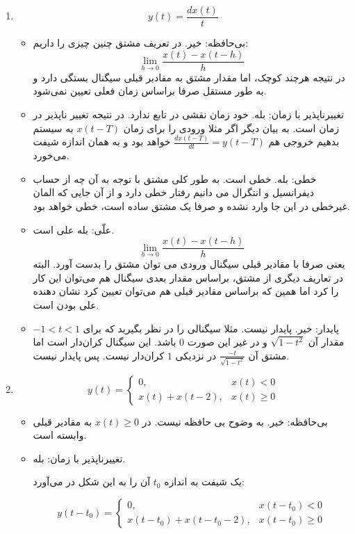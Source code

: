 \documentclass[12pt]{article}
\begin{document}
\begin{enumerate}[label = \harfi*)]
\item

$$
y(t) = \frac{d x(t)}{t}
$$

\begin{itemize}
	\item
	بی‌حافظه: خیر. در تعریف مشتق چنین چیزی را داریم:
	$$\lim_{h \to 0} \frac{x(t) - x(t-h)}{h}$$
	در نتیجه هر‌چند کوچک، اما مقدار مشتق به مقادیر قبلی سیگنال بستگی دارد و به طور مستقل صرفا براساس زمان فعلی تعیین نمی‌شود.
	\item
	تغییرناپذیر با زمان: بله. خود زمان نقشی در تابع ندارد. در نتیجه تغییر ناپذیر در زمان است. به بیان دیگر اگر مثلا ورودی را برای زمان $x(t-T)$ به سیستم بدهیم خروجی هم
	$\frac{d x(t-T)}{dt} = y(t-T)$
	خواهد بود و به همان اندازه شیفت می‌خورد.
	
	\item
	خطی: بله. خطی است. به طور کلی مشتق با توجه به آن چه از حساب دیفرانسیل و انتگرال می دانیم رفتار خطی دارد و از آن جایی که المان غیرخطی در این جا وارد نشده و صرفا یک مشتق ساده است، خطی خواهد بود.
	\item
	علّی: 
	بله علی است. 
		$$\lim_{h \to 0} \frac{x(t) - x(t-h)}{h}$$
		یعنی صرفا با مقادیر قبلی سیگنال ورودی می توان مشتق را بدست آورد. البته در تعاریف دیگری از مشتق، براساس مقدار بعدی سیگنال هم می‌توان این کار را کرد اما همین که براساس مقادیر قبلی هم می‌توان تعیین کرد نشان دهنده علی بودن است.
	\item
	پایدار: خیر. پایدار نیست. مثلا سیگنالی را در نظر بگیرید که برای $-1<t<1$ مقدار آن
	$\sqrt{1-t^2}$
	و در غیر این صورت $0$ باشد. این سیگنال کران‌دار است اما مشتق آن
	$\frac{-t}{\sqrt{1-t^2}}$
	در نزدیکی $1$ کران‌دار نیست. پس پایدار نیست.
	
	

\end{itemize}


\item
$$
y(t)=\left\{\begin{array}{ll}
	0, & x(t)<0 \\
	x(t)+x(t-2), & x(t) \geq 0
\end{array}\right.
$$


\begin{itemize}
	\item
	بی‌حافظه: خیر. به وضوح بی حافظه نیست.  در $x(t)\geq0$ به مقادیر قبلی وابسته است.
	\item
	تغییرناپذیر با زمان:  بله.
	
	 یک شیفت به اندازه $t_0$ آن را به این شکل در می‌آورد:
	 
	 $$
	 y\left(t-t_{0}\right)=\left\{\begin{array}{ll}
	 	0, & x\left(t-t_{0}\right)<0 \\
	 	x\left(t-t_{0}\right)+x\left(t-t_{0}-2\right), & x\left(t-t_{0}\right) \geq 0
	 \end{array}\right.
	 $$
	 

\end{itemize}
\end{enumerate}
\end{document}
